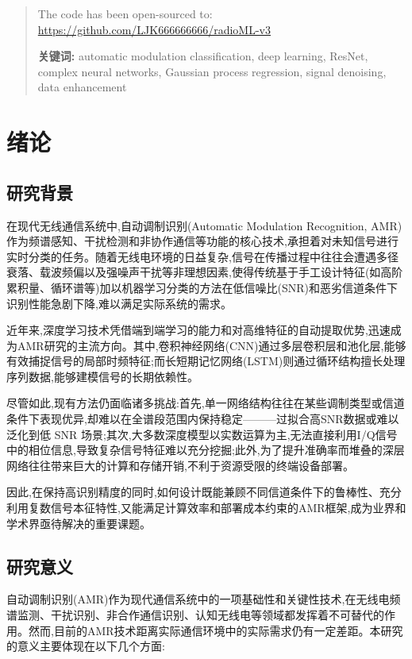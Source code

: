 \documentclass{article}
\newcommand{\keywords}[1]{\textbf{关键词:} #1}
\begin{document}
\begin{CJK}{UTF8}{gbsn}
\begin{abstract}
The code has been open-sourced to: \url{https://github.com/LJK666666666/radioML-v3}

\keywords{automatic modulation classification, deep learning, ResNet, complex neural networks, Gaussian process regression, signal denoising, data enhancement}
\end{abstract}

\newpage
\tableofcontents

\newpage
\section{绪论}

\subsection{研究背景}
在现代无线通信系统中,自动调制识别(Automatic Modulation Recognition, AMR)作为频谱感知、干扰检测和非协作通信等功能的核心技术,承担着对未知信号进行实时分类的任务。随着无线电环境的日益复杂,信号在传播过程中往往会遭遇多径衰落、载波频偏以及强噪声干扰等非理想因素,使得传统基于手工设计特征(如高阶累积量、循环谱等)加以机器学习分类的方法在低信噪比(SNR)和恶劣信道条件下识别性能急剧下降,难以满足实际系统的需求。

近年来,深度学习技术凭借端到端学习的能力和对高维特征的自动提取优势,迅速成为AMR研究的主流方向。其中,卷积神经网络(CNN)通过多层卷积层和池化层,能够有效捕捉信号的局部时频特征;而长短期记忆网络(LSTM)则通过循环结构擅长处理序列数据,能够建模信号的长期依赖性。

尽管如此,现有方法仍面临诸多挑战:首先,单一网络结构往往在某些调制类型或信道条件下表现优异,却难以在全谱段范围内保持稳定———过拟合高SNR数据或难以泛化到低 SNR 场景;其次,大多数深度模型以实数运算为主,无法直接利用I/Q信号中的相位信息,导致复杂信号特征难以充分挖掘;此外,为了提升准确率而堆叠的深层网络往往带来巨大的计算和存储开销,不利于资源受限的终端设备部署。

因此,在保持高识别精度的同时,如何设计既能兼顾不同信道条件下的鲁棒性、充分利用复数信号本征特性,又能满足计算效率和部署成本约束的AMR框架,成为业界和学术界亟待解决的重要课题。

\subsection{研究意义}
自动调制识别(AMR)作为现代通信系统中的一项基础性和关键性技术,在无线电频谱监测、干扰识别、非合作通信识别、认知无线电等领域都发挥着不可替代的作用。然而,目前的AMR技术距离实际通信环境中的实际需求仍有一定差距。本研究的意义主要体现在以下几个方面:


\end{CJK}
\end{document}

